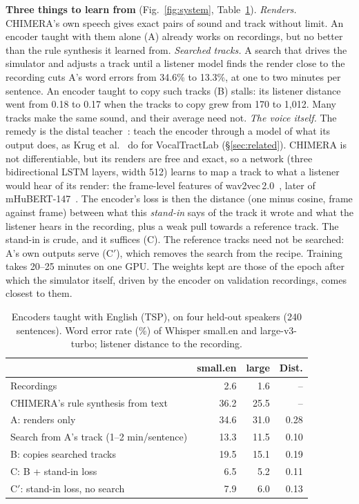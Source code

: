 \documentclass[10pt,a4paper,twocolumn]{article}
\begin{document}
\textbf{Three things to learn from} (Fig.~\ref{fig:system}, Table~\ref{tab:english}).
\emph{Renders.} CHIMERA's own speech gives exact pairs of sound and track without limit. An
encoder taught with them alone (A) already works on recordings, but no better than the rule
synthesis it learned from. \emph{Searched tracks.} A search that drives the simulator and
adjusts a track until a listener model finds the render close to the recording cuts A's word
errors from 34.6\% to 13.3\%, at one to two minutes per sentence. An encoder taught to copy such tracks (B) stalls: its
listener distance went from 0.18 to 0.17 when the tracks to copy grew from 170 to 1,012. Many
tracks make the same sound, and their average need not. \emph{The voice itself.} The remedy is
the distal teacher~\cite{distal}: teach the encoder through a model of what its output does,
as Krug et al.~\cite{krug} do for VocalTractLab (\S\ref{sec:related}).
CHIMERA is not differentiable, but its renders are free and exact, so a network (three
bidirectional LSTM layers, width 512) learns to map a track to what a listener would hear of its
render: the frame-level features of wav2vec\,2.0~\cite{wav2vec2}, later of
mHuBERT-147~\cite{mhubert}. The encoder's loss is then the distance (one minus cosine, frame
against frame) between what this \emph{stand-in} says of the track it wrote and what the listener
hears in the recording, plus a weak pull towards a reference track. The stand-in is crude, and
it suffices (C). The reference tracks need not be searched: A's own outputs serve (C$'$), which
removes the search from the recipe. Training takes 20--25 minutes on one GPU. The weights kept
are those of the epoch after which the simulator itself, driven by the encoder on validation
recordings, comes closest to them.

\begin{table}[t]
\centering\footnotesize\setlength{\tabcolsep}{3pt}
\caption{Encoders taught with English (TSP), on four held-out speakers (240 sentences). Word
error rate (\%) of Whisper small.en and large-v3-turbo; listener distance to the recording.}
\label{tab:english}
\begin{tabular}{@{}lrrr@{}}
\toprule
& small.en & large & Dist.\\
\midrule
Recordings & 2.6 & 1.6 & --\\
CHIMERA's rule synthesis from text & 36.2 & 25.5 & --\\
A: renders only & 34.6 & 31.0 & 0.28\\
Search from A's track (1--2 min/sentence) & 13.3 & 11.5 & 0.10\\
B: copies searched tracks & 19.5 & 15.1 & 0.19\\
C: B + stand-in loss & 6.5 & 5.2 & 0.11\\
C$'$: stand-in loss, no search & 7.9 & 6.0 & 0.13\\
\bottomrule
\end{tabular}
\end{table}
\end{document}
